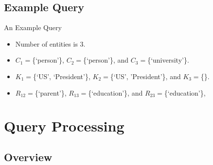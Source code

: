 \documentclass[pdf,11pt]{beamer}
\begin{document}
\subsection{Example Query}
\begin{frame}{An Example Query}

\vspace{11pt}


\vspace{11pt}


\begin{itemize}
\item<4-> Number of entities is 3.
\item<5-> $C_1=$\{`person'\}, $C_2=$\{`person'\}, and $C_3=$\{`university'\}.
\item<6-> $K_1=$\{`US', `President'\}, $K_2=$\{`US', 'President'\}, and $K_3=$\{\}.
\item<7-> $R_{12}=$\{`parent'\}, $R_{13}=$\{`education'\}, and $R_{23}=$\{`education'\},
\end{itemize}

\end{frame}

\section{Query Processing}

\subsection{Overview}
\end{document}
